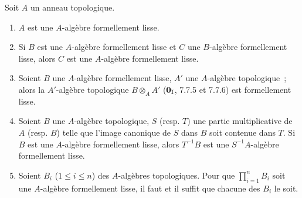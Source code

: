 \begin{proposition}[19.3.5]
\label{0.19.3.5-fr}
Soit $A$ un anneau topologique.
\begin{enumerate}
  \item[(i)] $A$ est une $A$-algèbre formellement lisse.
  \item[(ii)] Si $B$ est une $A$-algèbre formellement lisse et $C$ une
  $B$-algèbre formellement lisse, alors $C$ est une $A$-algèbre formellement
  lisse.
  \item[(iii)] Soient $B$ une $A$-algèbre formellement lisse, $A'$ une
  $A$-algèbre topologique~; alors la $A'$-algèbre topologique
  $B\otimes_A A'$ ($\mathbf 0_{\rm I}$, 7.7.5 et 7.7.6) est formellement
  lisse.
  \item[(iv)] Soient $B$ une $A$-algèbre topologique, $S$ (resp. $T$) une
  partie multiplicative de $A$ (resp. $B$) telle que l'image canonique de $S$
  dans $B$ soit contenue dans $T$. Si $B$ est une $A$-algèbre formellement
  lisse, alors $T^{-1}B$ est une $S^{-1}A$-algèbre formellement lisse.
  \item[(v)] Soient $B_i$ ($1\leq i\leq n$) des $A$-algèbres topologiques.
  Pour que $\prod_{i=1}^n B_i$ soit une $A$-algèbre formellement lisse, il
  faut et il suffit que chacune des $B_i$ le soit.
\end{enumerate}
\end{proposition}


